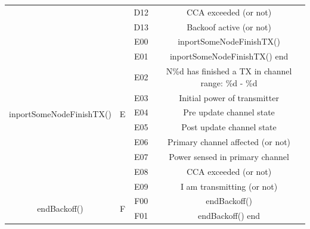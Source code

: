 \documentclass[a4paper]{article}
\begin{document}
\begin{table}[]
\begin{tabular}{|c|c|c|c|}
                                           &                     & D12               & CCA exceeded (or not)                                   \\ \cline{3-4} 
                                           &                     & D13               & Backoof active (or not)                                 \\ \hline
\multirow{10}{*}{inportSomeNodeFinishTX()} & \multirow{10}{*}{E} & E00               & inportSomeNodeFinishTX()                                \\ \cline{3-4} 
                                           &                     & E01               & inportSomeNodeFinishTX() end                            \\ \cline{3-4} 
                                           &                     & E02               & N\%d has finished a TX in channel range: \%d - \%d      \\ \cline{3-4} 
                                           &                     & E03               & Initial power of transmitter                            \\ \cline{3-4} 
                                           &                     & E04               & Pre update channel state                                \\ \cline{3-4} 
                                           &                     & E05               & Post update channel state                               \\ \cline{3-4} 
                                           &                     & E06               & Primary channel affected (or not)                       \\ \cline{3-4} 
                                           &                     & E07               & Power sensed in primary channel                         \\ \cline{3-4} 
                                           &                     & E08               & CCA exceeded (or not)                                   \\ \cline{3-4} 
                                           &                     & E09               & I am transmitting (or not)                              \\ \hline
\multirow{6}{*}{endBackoff()}              & \multirow{6}{*}{F}  & F00               & endBackoff()                                            \\ \cline{3-4} 
                                           &                     & F01               & endBackoff() end                                        \\ \cline{3-4} 

\end{tabular}
\end{table}
\end{document}

